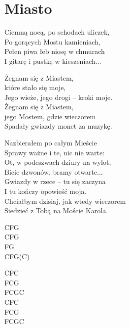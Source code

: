 \section{Miasto}
\begin{text}
Ciemną nocą, po schodach uliczek,\\
Po gorących Mostu kamieniach,\\
Pełen piwa łeb niosę w chmurach\\
I gitarę i pustkę w kieszeniach...

\vin Żegnam się  z Miastem,\\
\vin które  stało się moje,\\
\vin Jego wieże, jego drogi – kroki moje.	\\
\vin Żegnam się  z Miastem,\\
\vin jego Mostem, gdzie wieczorem\\
\vin Spadały gwiazdy monet za muzykę.

Nazbierałem po całym Mieście\\
Sprawy ważne i te, nic nie warte:\\
Ot, w podeszwach dziury na wylot,\\
Bicie dzwonów, bramy otwarte...\\

Gwiazdy w rzece – tu się zaczyna\\
I tu kończy opowieść moja.\\
Chciałbym dzisiaj, jak wtedy wieczorem\\
Siedzieć z Tobą na Moście Karola.
\end{text}
\begin{chord}
CFG\\
CFG\\
FG\\
CFG(C)

CFC\\
FCG\\
FCGC\\
CFC\\
FCG\\
FCGC
\end{chord}